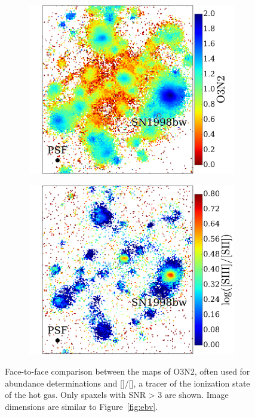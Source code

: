 \documentclass[traditabstract]{aa}
\newcommand{\sii}{[\ion{S}{ii}]}
\newcommand{\siii}{[\ion{S}{iii}]}
\begin{document}
\begin{figure}
\begin{subfigure}{.24\textwidth}
  \includegraphics[width=0.999\linewidth]{Figs/MUSE_SN1998bw_O3N2.pdf}
\end{subfigure}
\begin{subfigure}{.24\textwidth}
  \includegraphics[width=0.999\linewidth]{Figs/MUSE_SN1998bw_S3S2.pdf}
\end{subfigure}
\caption{Face-to-face comparison between the maps of O3N2, often used for abundance determinations and \siii/\sii, a tracer of the ionization state of the hot gas. Only spaxels with SNR > 3 are shown. Image dimensions are similar to Figure~\ref{fig:ebv}.}
\label{fig:s3s2}
\end{figure}
\end{document}
